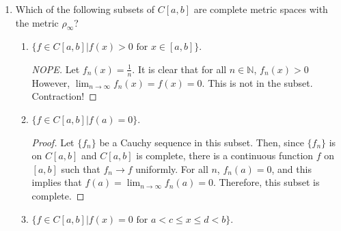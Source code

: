 \documentclass{article}
\begin{document}
\begin{enumerate}
\begin{enumerate}
\begin{proof}
                              metric space is complete.
                        \end{proof}
                  \item $\{(x, y)\in\mathbb{R}^2|f(x,y)=0 \}$, where $f$ is
                        continuous on $\mathbb{R}^2$.
                        \begin{proof}
                              I'm convinced that this is true, but I do not know
                              how to prove it. Picture a 3d function that intersects
                              with the plane $z=0$ all over the place. Since $f$ is
                              continuous there aren't any discontinuities on $z=0$,
                              which means that any subsequence will be able to find
                              a home.
                        \end{proof}
            \end{enumerate}
      \item Which of the following subsets of $C[a,b]$ are complete metric
            spaces with the metric $\rho_\infty$?
            \begin{enumerate}
                  \item $\{f\in C[a,b]|f(x)>0\text{ for }x\in [a,b]\}$.
                        \begin{proof}[NOPE]
                              Let $f_n(x)=\frac{1}{n}$. It is clear that for all
                              $n\in\mathbb{N}$, $f_n(x)>0$ However,
                              $\lim_{n\to\infty}f_n(x)=f(x)=0$. This is not in
                              the subset. Contraction!
                        \end{proof}
                  \item $\{f\in C[a,b]|f(a)=0\}$.
                        \begin{proof}
                              Let $\{f_n\}$ be a Cauchy sequence in this subset.
                              Then, since $\{f_n\}$ is on $C[a,b]$ and $C[a,b]$
                              is complete, there is a continuous function $f$
                              on $[a,b]$ such that $f_n\to f$ uniformly. For all
                              $n$, $f_n(a)=0$, and this implies that
                              $f(a)=\lim_{n\to\infty}f_n(a)=0$. Therefore, this
                              subset is complete.
                        \end{proof}
                  \item $\{f\in C[a,b]|f(x)=0\text{ for }a<c\leq x\leq d<b\}$.

\end{enumerate}
\end{enumerate}
\end{document}
